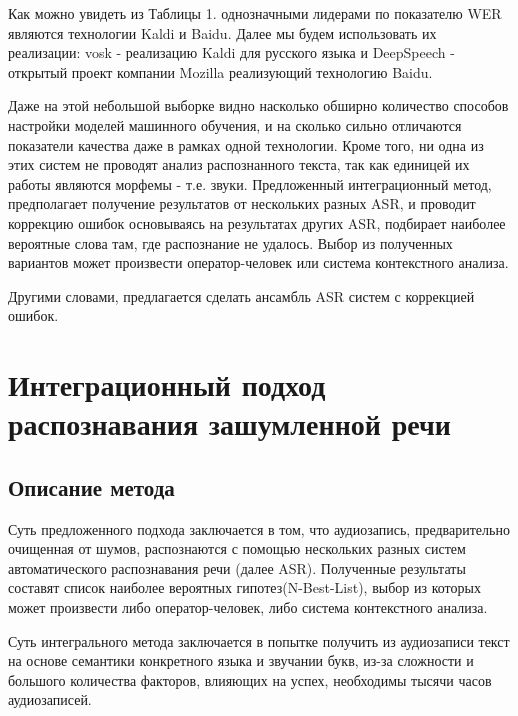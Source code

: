 \documentclass[conference]{IEEEtran}
\begin{document}
Как можно увидеть из Таблицы 1. однозначными лидерами по показателю WER являются технологии Kaldi и Baidu. Далее мы будем использовать их реализации: vosk - реализацию Kaldi для русского языка и DeepSpeech - открытый проект компании Mozilla реализующий технологию Baidu.

Даже на этой небольшой выборке видно насколько обширно количество способов настройки моделей машинного обучения, и на сколько сильно отличаются показатели качества даже в рамках одной технологии. Кроме того, ни одна из этих систем не проводят анализ распознанного текста, так как единицей их работы являются морфемы - т.е. звуки. Предложенный интеграционный метод, предполагает получение результатов от нескольких разных ASR, и проводит коррекцию ошибок основываясь на результатах других ASR, подбирает наиболее вероятные слова там, где распознание не удалось. Выбор из полученных вариантов может произвести оператор-человек или система контекстного анализа.

Другими словами, предлагается сделать ансамбль ASR систем с коррекцией ошибок.

\section{Интеграционный подход распознавания зашумленной речи}
\subsection{Описание метода}
Суть предложенного подхода заключается в том, что аудиозапись, предварительно очищенная от шумов, распознаются с помощью нескольких разных систем автоматического распознавания речи (далее ASR). Полученные результаты составят список наиболее вероятных гипотез(N-Best-List), выбор из которых может произвести либо оператор-человек, либо система контекстного анализа.

Суть интегрального метода заключается в попытке получить из аудиозаписи текст на основе семантики конкретного языка и звучании букв, из-за сложности и большого количества факторов, влияющих на успех, необходимы тысячи часов аудиозаписей.
\end{document}
